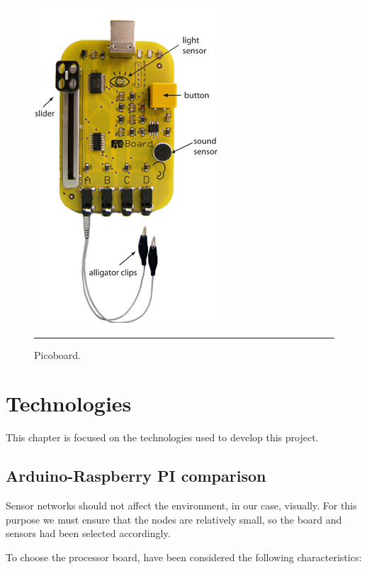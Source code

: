 \documentclass[12pt, a4paper,twoside]{tesi_upf}
\begin{document}
      \begin{figure}[htbp]
          \centering
              \includegraphics[scale=0.5]{./Figures/picoboard.jpg}
              \\
              \rule{16em}{0.5pt}
          \caption[Picoboard]{Picoboard.}
          \label{fig:picoboard}
       \end{figure}

\chapter{Technologies}
\label{Chapter3}
  
  This chapter is focused on the technologies used to develop this project.
  
  \section{Arduino-Raspberry PI comparison}
  
  	Sensor networks should not affect the environment, in our case, visually. For this purpose we must ensure that the nodes are relatively small, so the board and sensors had been selected accordingly.
    
    To choose the processor board, have been considered the following characteristics:
    
\end{document}
